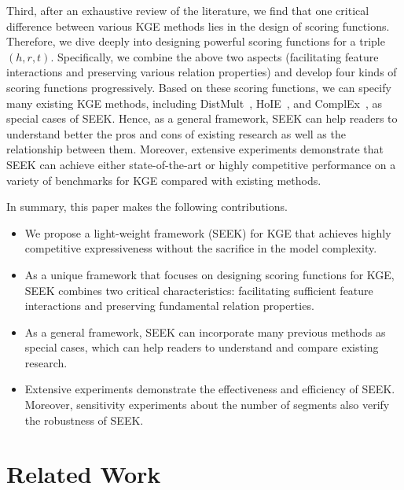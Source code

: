 \documentclass[11pt,a4paper]{article}
\begin{document}
Third, after an exhaustive review of the literature, we find that one critical difference between various KGE methods lies in the design of scoring functions.
Therefore, we dive deeply into designing powerful scoring functions for a triple $(h, r, t)$.
Specifically, we combine the above two aspects (facilitating feature interactions and preserving various relation properties) and develop four kinds of scoring functions progressively.
Based on these scoring functions, we can specify many existing KGE methods, including DistMult~\cite{yang2015embedding}, HoIE~\cite{nickel2016holographic}, and ComplEx~\cite{trouillon2016complex}, as special cases of SEEK.
Hence, as a general framework, SEEK can help readers to understand better the pros and cons of existing research as well as the relationship between them.
Moreover, extensive experiments demonstrate that SEEK can achieve either state-of-the-art or highly competitive performance on a variety of benchmarks for KGE compared with existing methods.

In summary, this paper makes the following contributions.
\begin{itemize}[label={-},leftmargin=1.5em]
	\item We propose a light-weight framework (SEEK) for KGE that achieves highly competitive expressiveness without the sacrifice in the model complexity.
	\item As a unique framework that focuses on designing scoring functions for KGE, SEEK combines two critical characteristics: facilitating sufficient feature interactions and preserving fundamental relation properties.
	\item As a general framework, SEEK can incorporate many previous methods as special cases, which can help readers to understand and compare existing research.
	\item Extensive experiments demonstrate the effectiveness and efficiency of SEEK. Moreover, sensitivity experiments about the number of segments also verify the robustness of SEEK. 
\end{itemize}


 \section{Related Work}
\label{sec:related}
\end{document}
